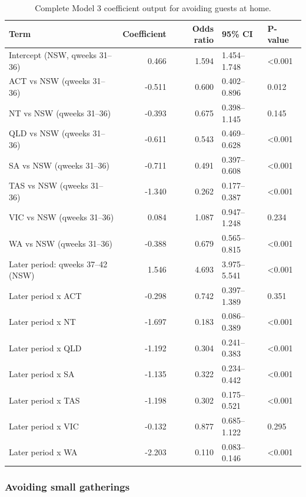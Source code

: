 \documentclass[
  12pt,
  a4paper,
]{article}
\begin{document}
\begin{longtable}[t]{lrrll}
\caption{\label{tab:model3-guests-appendix}Complete Model 3 coefficient output for avoiding guests at home.}\\
\toprule
Term & Coefficient & Odds ratio & 95\% CI & P-value\\
\midrule
Intercept (NSW, qweeks 31--36) & 0.466 & 1.594 & 1.454--1.748 & <0.001\\
ACT vs NSW (qweeks 31--36) & -0.511 & 0.600 & 0.402--0.896 & 0.012\\
NT vs NSW (qweeks 31--36) & -0.393 & 0.675 & 0.398--1.145 & 0.145\\
QLD vs NSW (qweeks 31--36) & -0.611 & 0.543 & 0.469--0.628 & <0.001\\
SA vs NSW (qweeks 31--36) & -0.711 & 0.491 & 0.397--0.608 & <0.001\\
\addlinespace
TAS vs NSW (qweeks 31--36) & -1.340 & 0.262 & 0.177--0.387 & <0.001\\
VIC vs NSW (qweeks 31--36) & 0.084 & 1.087 & 0.947--1.248 & 0.234\\
WA vs NSW (qweeks 31--36) & -0.388 & 0.679 & 0.565--0.815 & <0.001\\
Later period: qweeks 37--42 (NSW) & 1.546 & 4.693 & 3.975--5.541 & <0.001\\
Later period x ACT & -0.298 & 0.742 & 0.397--1.389 & 0.351\\
\addlinespace
Later period x NT & -1.697 & 0.183 & 0.086--0.389 & <0.001\\
Later period x QLD & -1.192 & 0.304 & 0.241--0.383 & <0.001\\
Later period x SA & -1.135 & 0.322 & 0.234--0.442 & <0.001\\
Later period x TAS & -1.198 & 0.302 & 0.175--0.521 & <0.001\\
Later period x VIC & -0.132 & 0.877 & 0.685--1.122 & 0.295\\
\addlinespace
Later period x WA & -2.203 & 0.110 & 0.083--0.146 & <0.001\\
\bottomrule
\end{longtable}

\clearpage

\subsubsection{Avoiding small gatherings}\label{avoiding-small-gatherings}
\end{document}
